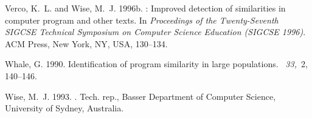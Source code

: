 \documentclass{tlp}
\begin{document}
\begin{thebibliography}{}
{\sc Verco, K.~L.} {\sc and} {\sc Wise, M.~J.} 1996b.
: Improved detection of similarities in computer program and
  other texts.
\newblock In {\em Proceedings of the Twenty-Seventh {SIGCSE} Technical
  Symposium on Computer Science Education {\rm (}SIGCSE 1996{\rm )}}. ACM
  Press, New York, NY, USA, 130--134.

{\sc Whale, G.} 1990.
\newblock Identification of program similarity in large populations.
~{\em 33,\/}~2, 140--146.

{\sc Wise, M.~J.} 1993.
.
\newblock Tech. rep., Basser Department of Computer Science, University of
  Sydney, Australia.

\end{thebibliography}
\end{document}
